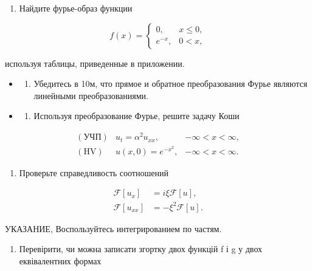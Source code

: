 \documentclass[
  ukrainian,
]{article}
\providecommand{\tightlist}{%
  \setlength{\itemsep}{0pt}\setlength{\parskip}{0pt}}
\begin{document}
\begin{enumerate}
\def\labelenumi{\arabic{enumi}.}
\tightlist
\item
  Найдите фурье-образ функции
\end{enumerate}

\[
f(x) =
\begin{cases} 0, & x \leq 0, \\ e^{-x}, & 0 < x, \end{cases}
\]

используя таблицы, приведенные в приложении.

\begin{itemize}
\tightlist
\item
  \begin{enumerate}
  \def\labelenumi{\arabic{enumi}.}
  \setcounter{enumi}{1}
  \tightlist
  \item
    Убедитесь в 10м, что прямое и обратное преобразования Фурье являются
    линейными преобразованиями.
  \end{enumerate}
\item
  \begin{enumerate}
  \def\labelenumi{\arabic{enumi}.}
  \setcounter{enumi}{2}
  \tightlist
  \item
    Используя преобразование Фурье, решите задачу Коши
  \end{enumerate}
\end{itemize}

\[
\begin{aligned} (\text{УЧП}) & u_t = \alpha^2 u_{xx}, & -\infty < x < \infty, \\ (\text{HV}) & u(x, 0) = e^{-x^2}, & -\infty < x < \infty. \end{aligned}
\]

\begin{enumerate}
\def\labelenumi{\arabic{enumi}.}
\setcounter{enumi}{3}
\tightlist
\item
  Проверьте справедливость соотношений
\end{enumerate}

\[
\begin{aligned} \mathcal{F}\left[u_{x}\right] &= i\xi \mathcal{F}\left[u\right], \\ \mathcal{F}\left[u_{xx}\right] &= -\xi^{2} \mathcal{F}\left[u\right]. \end{aligned}
\]

УКАЗАНИЕ, Воспользуйтесь интегрированием по частям.

\begin{enumerate}
\def\labelenumi{\arabic{enumi}.}
\setcounter{enumi}{4}
\tightlist
\item
  Перевірити, чи можна записати згортку двох функцій f і g у двох
  еквівалентних формах
\end{enumerate}
\end{document}
